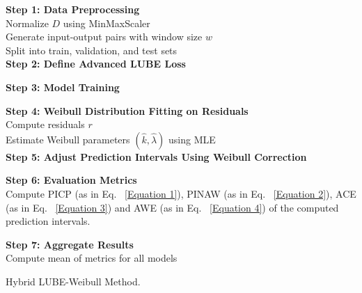 \begin{algorithm}[H]
    \normalsize
    \SetAlgoCaptionSeparator{:}
    
    
    \textbf{Step 1: Data Preprocessing}\\
    Normalize $D$ using MinMaxScaler\\
    Generate input-output pairs with window size $w$\\
    Split into train, validation, and test sets\\
    
    \textbf{Step 2: Define Advanced LUBE Loss}\\
    
    \textbf{Step 3: Model Training}\\
    
    \textbf{Step 4: Weibull Distribution Fitting on Residuals}\\
    Compute residuals $r$\\
    Estimate Weibull parameters $(\hat{k}, \hat{\lambda})$ using MLE\\
    
    \textbf{Step 5: Adjust Prediction Intervals Using Weibull Correction}\\
    
    \textbf{Step 6: Evaluation Metrics}\\
    Compute PICP (as in Eq. ~\eqref{Equation 1}), PINAW (as in Eq. ~\eqref{Equation 2}), ACE (as in Eq. ~\eqref{Equation 3}) and AWE (as in Eq. ~\eqref{Equation 4}) of the computed prediction intervals.
    
    \textbf{Step 7: Aggregate Results}\\
    Compute mean of metrics for all models
    
    \caption{Hybrid LUBE-Weibull Method.}
\end{algorithm}

